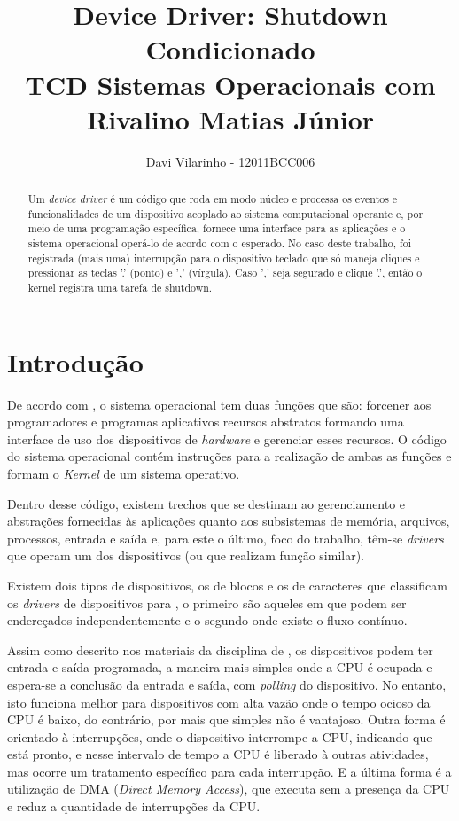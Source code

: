 \documentclass{article}
\title{Device Driver: Shutdown Condicionado \\
      \small TCD Sistemas Operacionais com Rivalino Matias Júnior}
\author{Davi Vilarinho - 12011BCC006}
\begin{document}
\maketitle

\begin{abstract}
  Um \emph{device driver} é um código que roda em modo núcleo e processa
  os eventos e funcionalidades de um dispositivo acoplado ao sistema 
  computacional operante e, por meio de uma programação específica, fornece
  uma interface para as aplicações e o sistema operacional operá-lo de acordo
  com o esperado. No caso deste trabalho, foi registrada (mais uma) interrupção
  para o dispositivo teclado que só maneja cliques e pressionar as teclas '.'
  (ponto) e ',' (vírgula). Caso ',' seja segurado e clique '.', então o
  kernel registra uma tarefa de shutdown.
\end{abstract}

\section{Introdução}

De acordo com \textcite{TanenbaumBos14}, o sistema operacional tem duas
funções que são: forcener aos programadores e programas aplicativos recursos
abstratos formando uma interface de uso dos dispositivos de \emph{hardware} e gerenciar
esses recursos. O código do sistema operacional contém instruções para a
realização de ambas as funções e formam o \emph{Kernel} de um sistema operativo.

Dentro desse código, existem trechos que se destinam ao gerenciamento
e abstrações fornecidas às aplicações quanto aos subsistemas de
memória, arquivos, processos, entrada e saída e, para este o último, foco do
trabalho, têm-se \emph{drivers} que operam um dos dispositivos (ou que realizam
função similar).

Existem dois tipos de dispositivos, os de blocos e os de caracteres que
classificam os \emph{drivers} de dispositivos para \textcite{TanenbaumBos14},
o primeiro são aqueles em que podem ser endereçados independentemente e o
segundo onde existe o fluxo contínuo.

Assim como descrito nos materiais da disciplina de \textcite{Slide7Rivalino},
os dispositivos podem ter entrada e saída programada, a maneira mais simples
onde a CPU é ocupada e espera-se a conclusão da entrada e saída, com
\emph{polling} do dispositivo. No entanto, isto funciona melhor para
dispositivos com alta vazão onde o tempo ocioso da CPU é baixo, do contrário,
por mais que simples não é vantajoso. Outra forma é orientado à interrupções, 
onde o dispositivo interrompe a CPU, indicando que está pronto, e nesse
intervalo de tempo a CPU é liberado à outras atividades, mas ocorre um
tratamento específico para cada interrupção. E a última forma é a utilização de
DMA (\emph{Direct Memory Access}), que executa sem a presença da CPU e reduz a
quantidade de interrupções da CPU.
\end{document}

